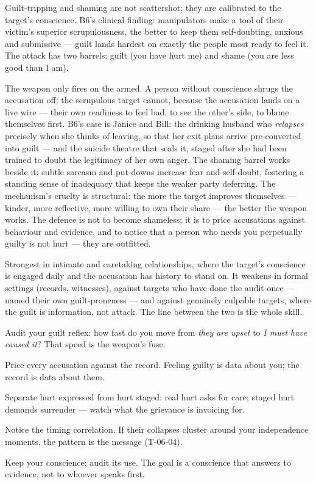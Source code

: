 \begin{core}
Guilt-tripping and shaming are not scattershot; they are calibrated to the target's conscience. B6's clinical finding: manipulators make a tool of their victim's superior scrupulousness, the better to keep them self-doubting, anxious and submissive --- guilt lands hardest on exactly the people most ready to feel it. The attack has two barrels: guilt (you have hurt me) and shame (you are less good than I am).
\end{core}
\begin{mechanism}
The weapon only fires on the armed. A person without conscience shrugs the accusation off; the scrupulous target cannot, because the accusation lands on a live wire --- their own readiness to feel bad, to see the other's side, to blame themselves first. B6's case is Janice and Bill: the drinking husband who \emph{relapses} precisely when she thinks of leaving, so that her exit plans arrive pre-converted into guilt --- and the suicide theatre that seals it, staged after she had been trained to doubt the legitimacy of her own anger. The shaming barrel works beside it: subtle sarcasm and put-downs increase fear and self-doubt, fostering a standing sense of inadequacy that keeps the weaker party deferring. The mechanism's cruelty is structural: the more the target improves themselves --- kinder, more reflective, more willing to own their share --- the better the weapon works. The defence is not to become shameless; it is to price accusations against behaviour and evidence, and to notice that a person who needs you perpetually guilty is not hurt --- they are outfitted.
\end{mechanism}
\begin{conditions}
Strongest in intimate and caretaking relationships, where the target's conscience is engaged daily and the accusation has history to stand on. It weakens in formal settings (records, witnesses), against targets who have done the audit once --- named their own guilt-proneness --- and against genuinely culpable targets, where the guilt is information, not attack. The line between the two is the whole skill.
\end{conditions}
\begin{application}
  \item Audit your guilt reflex: how fast do you move from \emph{they are upset} to \emph{I must have caused it}? That speed is the weapon's fuse.
  \item Price every accusation against the record. Feeling guilty is data about you; the record is data about them.
  \item Separate hurt expressed from hurt staged: real hurt asks for care; staged hurt demands surrender --- watch what the grievance is invoicing for.
  \item Notice the timing correlation. If their collapses cluster around your independence moments, the pattern is the message (T-06-04).
  \item Keep your conscience; audit its use. The goal is a conscience that answers to evidence, not to whoever speaks first.
\end{application}
